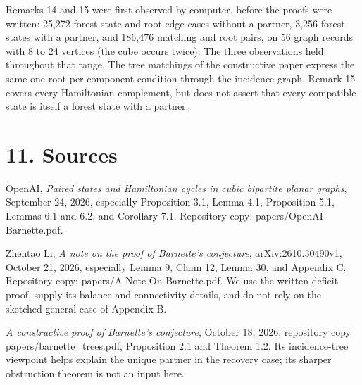 \documentclass[a4paper,11pt]{amsart}
\begin{document}
Remarks 14 and 15 were first observed by computer, before the proofs were written: 25,272 forest-state and root-edge cases without a partner, 3,256 forest states with a partner, and 186,476 matching and root pairs, on 56 graph records with 8 to 24 vertices (the cube occurs twice). The three observations held throughout that range. The tree matchings of the constructive paper express the same one-root-per-component condition through the incidence graph. Remark 15 covers every Hamiltonian complement, but does not assert that every compatible state is itself a forest state with a partner.

\section*{11. Sources}

OpenAI, \emph{Paired states and Hamiltonian cycles in cubic bipartite planar graphs}, September 24, 2026, especially Proposition 3.1, Lemma 4.1, Proposition 5.1, Lemmas 6.1 and 6.2, and Corollary 7.1. Repository copy: papers/OpenAI-Barnette.pdf.

Zhentao Li, \emph{A note on the proof of Barnette's conjecture}, arXiv:2610.30490v1, October 21, 2026, especially Lemma 9, Claim 12, Lemma 30, and Appendix C. Repository copy: papers/A-Note-On-Barnette.pdf. We use the written deficit proof, supply its balance and connectivity details, and do not rely on the sketched general case of Appendix B.

\emph{A constructive proof of Barnette's conjecture}, October 18, 2026, repository copy papers/barnette\_trees.pdf, Proposition 2.1 and Theorem 1.2. Its incidence-tree viewpoint helps explain the unique partner in the recovery case; its sharper obstruction theorem is not an input here.
\end{document}
